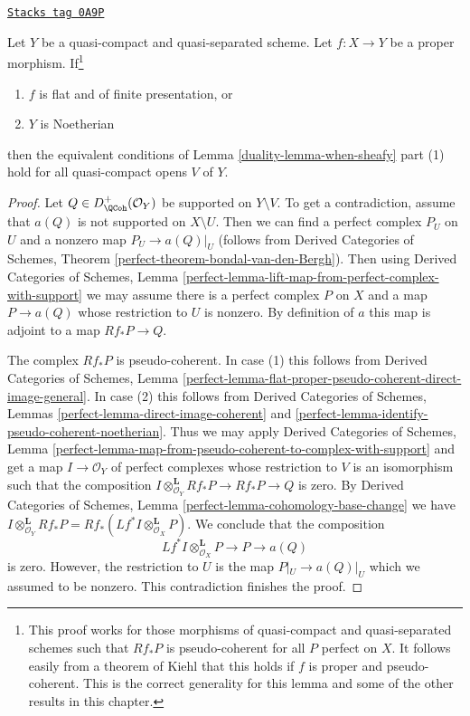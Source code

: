 \begin{lemma}
\label{duality-lemma-proper-noetherian}
\href{https://stacks.math.columbia.edu/tag/0A9P}{\texttt{Stacks tag 0A9P}}

Let $Y$ be a quasi-compact and quasi-separated scheme.
Let $f : X \to Y$ be a proper morphism. If\footnote{This proof works for those
morphisms of quasi-compact and quasi-separated schemes such that
$Rf_*P$ is pseudo-coherent for all $P$ perfect on $X$. It follows
easily from a theorem of Kiehl \cite{Kiehl} that this holds if
$f$ is proper and pseudo-coherent. This is the correct generality
for this lemma and some of the other results in this chapter.}
\begin{enumerate}
\item $f$ is flat and of finite presentation, or
\item $Y$ is Noetherian
\end{enumerate}
then the equivalent conditions of Lemma \ref{duality-lemma-when-sheafy} part (1)
hold for all quasi-compact opens $V$ of $Y$.
\end{lemma}

\begin{proof}
Let $Q \in D^+_\QCoh(\mathcal{O}_Y)$ be supported on $Y \setminus V$.
To get a contradiction, assume that $a(Q)$ is not supported on
$X \setminus U$. Then we can find a perfect complex $P_U$ on $U$
and a nonzero map $P_U \to a(Q)|_U$ (follows from
Derived Categories of Schemes, Theorem
\ref{perfect-theorem-bondal-van-den-Bergh}). Then using
Derived Categories of Schemes, Lemma
\ref{perfect-lemma-lift-map-from-perfect-complex-with-support}
we may assume there is a perfect complex $P$ on $X$ and a map
$P \to a(Q)$ whose restriction to $U$ is nonzero.
By definition of $a$ this map
is adjoint to a map $Rf_*P \to Q$.

\medskip\noindent
The complex $Rf_*P$ is pseudo-coherent. In case (1) this follows
from Derived Categories of Schemes, Lemma
\ref{perfect-lemma-flat-proper-pseudo-coherent-direct-image-general}.
In case (2) this follows from
Derived Categories of Schemes, Lemmas
\ref{perfect-lemma-direct-image-coherent} and
\ref{perfect-lemma-identify-pseudo-coherent-noetherian}.
Thus we may apply
Derived Categories of Schemes, Lemma
\ref{perfect-lemma-map-from-pseudo-coherent-to-complex-with-support}
and get a map $I \to \mathcal{O}_Y$ of perfect complexes
whose restriction to $V$ is an isomorphism such that the composition
$I \otimes^\mathbf{L}_{\mathcal{O}_Y} Rf_*P \to Rf_*P \to Q$ is zero.
By Derived Categories of Schemes, Lemma
\ref{perfect-lemma-cohomology-base-change}
we have $I \otimes^\mathbf{L}_{\mathcal{O}_Y} Rf_*P =
Rf_*(Lf^*I \otimes^\mathbf{L}_{\mathcal{O}_X} P)$.
We conclude that the composition
$$
Lf^*I \otimes^\mathbf{L}_{\mathcal{O}_X} P \to P \to a(Q)
$$
is zero. However, the restriction to $U$ is the map
$P|_U \to a(Q)|_U$ which we assumed to be nonzero.
This contradiction finishes the proof.
\end{proof}

